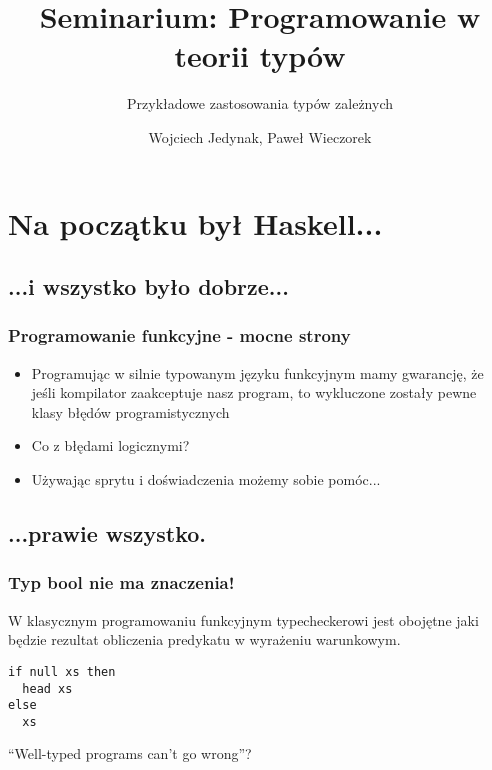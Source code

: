 \documentclass{beamer}
\title{Seminarium: Programowanie w teorii typów}
\subtitle{Przykładowe zastosowania typów zależnych}
\author{Wojciech Jedynak, Paweł Wieczorek}
\institute{Instytut Informatyki Uniwersytetu Wrocławskiego}
\begin{document}
\lstset{language=Haskell}

\maketitle




\section{Na początku był Haskell...}
\subsection{...i wszystko było dobrze...}

\begin{frame}

\frametitle{Programowanie funkcyjne - mocne strony}

\begin{itemize}
\item Programując w silnie typowanym języku funkcyjnym mamy gwarancję,
że jeśli kompilator zaakceptuje nasz program, to wykluczone zostały
pewne klasy błędów programistycznych 
\item Co z błędami logicznymi?
\item Używając sprytu i doświadczenia możemy sobie pomóc...
\end{itemize}

\end{frame}


\subsection{...prawie wszystko.}

\begin{frame}[fragile]
\frametitle{Typ bool nie ma znaczenia!}

W klasycznym programowaniu funkcyjnym typecheckerowi jest obojętne
jaki będzie rezultat obliczenia predykatu w wyrażeniu warunkowym.

\begin{lstlisting}
if null xs then 
  head xs 
else 
  xs
\end{lstlisting}


``Well-typed programs can't go wrong''?

\end{frame}
\end{document}

